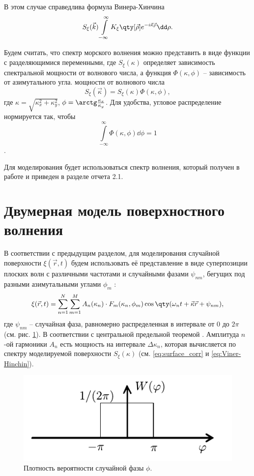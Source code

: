 В этом случае справедлива формула Винера-Хинчина \cite{cite:10}
\begin{equation}
    \label{eq:Viner-Hinchin}
    S_\xi(\vec k) \int\limits_{-\infty}^{\infty} K_\xi \qty[\vec \rho] e^{- i
    \vec \kappa \vec \rho} \dd \rho. 
\end{equation}


Будем считать, что спектр морского волнения можно представить в виде функции с
разделяющимися переменными, где $S_{\xi}(\kappa)$ определяет зависимость
спектральной мощности от волнового числа, а функция $\Phi(\kappa, \phi)$ -- 
зависимость от азимутального угла.
мощности от волнового числа
\begin{equation}
    S_\xi(\vec \kappa) = S_\xi(\kappa) \Phi(\kappa, \phi),
\end{equation}
где $\kappa = \sqrt{\kappa_x^2 + \kappa_y^2}$,  $\phi = \arctg
\frac{\kappa_x}{\kappa_y}$. Для
удобства, угловое распределение нормируется так, чтобы
$$\int\limits_{-\infty}^{\infty} \Phi(\kappa,\phi) \dd
\phi = 1$$.


Для моделирования будет использоваться спектр волнения, который получен в
работе \cite{cite:6} и приведен в разделе отчета 2.1.

\section{Двумерная модель поверхностного волнения}%
\label{sec:dvumernaia_model_poverkhnostnogo_volneniia}

В соответствии с предыдущим разделом, для моделирования случайной поверхности
$\xi(\vec r,t)$ будем использовать её представление в виде суперпозиции
плоских волн с различными частотами и случайными фазами $\psi_{nm}$, бегущих
под разными азимутальными углами $\phi_m$ \cite{cite:11}:
\begin{equation}
    \label{eq:surface2d}
    \xi(\vec r,t) = \sum\limits_{n=1}^{N} \sum\limits_{m=1}^{M}
    A_n(\kappa_n) \cdot
    F_m(\kappa_n,\phi_m) \cos \qty(\omega_n t + \vec \kappa \vec r + \psi_{nm}),
\end{equation}
где $\psi_{nm}$ -- случайная фаза, равномерно распределенная в интервале от $0$
до $2 \pi$ (см. рис. \ref{fig:phase}). В соответствии с
центральной предельной теоремой \cite{cite:7}. Амплитуда $n$-ой гармоники $A_n$ есть
мощность на интервале $\Delta \kappa_n$, которая вычисляется по спектру моделируемой
поверхности $S_\xi(\kappa)$ (см. \eqref{eq:surface_corr} и \eqref{eq:Viner-Hinchin}).

\begin{figure}[ht]
    \centering
    \includegraphics[scale=1]{fig/image65}
    \caption{Плотность вероятности случайной фазы $\phi$.}
    \label{fig:phase}
\end{figure}


